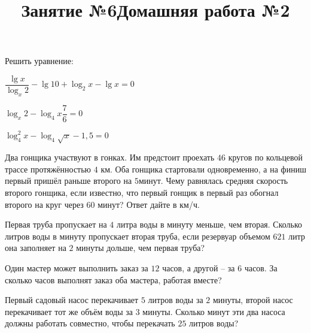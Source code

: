 \newpage
\title{Занятие №6}
\begin{listofex}
	\item Решить уравнение:
	\begin{enumcols}[itemcolumns=2]
		\item {}
		\item \( \dfrac{\lg x}{\log_x 2}-\lg10 + \log_2 x - \lg x = 0 \)
		\item {}
		\item \( \log_x 2 - \log_4 x \dfrac{7}{6} = 0 \)
		\item \( \log^2_4 x - \log_4\sqrt{x} - 1,5 = 0 \)
	\end{enumcols}
	\item {}
	\item {}
	\item Два гонщика участвуют в гонках. Им предстоит проехать \(46\) кругов по кольцевой трассе протяжённостью \(4\) км. Оба гонщика стартовали одновременно, а на финиш первый пришёл раньше второго на \(5\)минут. Чему равнялась средняя скорость второго гонщика, если известно, что первый гонщик в первый раз обогнал второго на круг через \(60\) минут? Ответ дайте в км/ч.
	\item Первая труба пропускает на \( 4 \) литра воды в минуту меньше, чем вторая. Сколько литров воды в минуту пропускает вторая труба, если резервуар объемом \(621 \) литр она заполняет на \( 2 \) минуты дольше, чем первая труба?
	\item Один мастер может выполнить заказ за \( 12 \) часов, а другой – за \( 6 \) часов. За сколько часов выполнят заказ оба мастера, работая вместе?
	\item Первый садовый насос перекачивает \( 5 \) литров воды за \( 2 \) минуты, второй насос перекачивает тот же объём воды за \( 3 \) минуты. Сколько минут эти два насоса должны работать совместно, чтобы перекачать \( 25 \) литров воды?
\end{listofex}
\newpage
\title{Домашняя работа №2}
